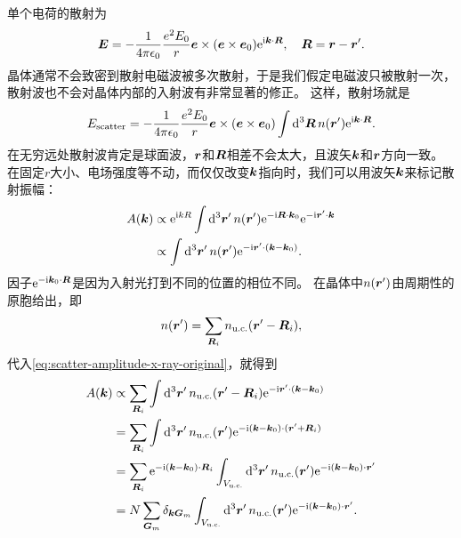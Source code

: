 \documentclass[hyperref, UTF8, a4paper]{ctexart}
\newcommand*{\ii}{\mathrm{i}}
\newcommand*{\ee}{\mathrm{e}}
\begin{document}
单个电荷的散射为
\begin{equation}
    \vb*{E} = -\frac{1}{4\pi \epsilon_0} \frac{e^2 E_0}{r} \vb*{e} \times (\vb*{e} \times \vb*{e}_0) \ee^{\ii \vb*{k} \cdot \vb*{R}}, \quad \vb*{R} = \vb*{r} - \vb*{r}'.
\end{equation}
晶体通常不会致密到散射电磁波被多次散射，于是我们假定电磁波只被散射一次，散射波也不会对晶体内部的入射波有非常显著的修正。
这样，散射场就是
\begin{equation}
    E_\text{scatter} = -\frac{1}{4\pi \epsilon_0} \frac{e^2 E_0}{r} \vb*{e} \times (\vb*{e} \times \vb*{e}_0) \int \dd[3]{\vb*{R}} n(\vb*{r}') \ee^{\ii \vb*{k} \cdot \vb*{R}}.
\end{equation}
在无穷远处散射波肯定是球面波，$\vb*{r}$和$\vb*{R}$相差不会太大，且波矢$\vb*{k}$和$\vb*{r}$方向一致。
在固定$r$大小、电场强度等不动，而仅仅改变$\vb*{k}$指向时，我们可以用波矢$\vb*{k}$来标记散射振幅：
\begin{equation}
    \begin{aligned}
        A(\vb*{k}) &\propto \ee^{\ii k R} \int \dd[3]{\vb*{r}'} n(\vb*{r}') \ee^{- \ii \vb*{R} \cdot \vb*{k}_0} \ee^{- \ii \vb*{r}' \cdot \vb*{k}} \\
        &\propto \int \dd[3]{\vb*{r}'} n(\vb*{r}') \ee^{- \ii \vb*{r}' \cdot (\vb*{k} - \vb*{k}_0)}.
    \end{aligned}
    \label{eq:scatter-amplitude-x-ray-original}
\end{equation}
因子$\ee^{- \ii \vb*{k}_0 \cdot \vb*{R}}$是因为入射光打到不同的位置的相位不同。
在晶体中$n(\vb*{r}')$由周期性的原胞给出，即
\begin{equation}
    n(\vb*{r}') = \sum_{\vb*{R}_i} n_\text{u.c.}(\vb*{r}' - \vb*{R}_i),
\end{equation}
代入\eqref{eq:scatter-amplitude-x-ray-original}，就得到
\[
    \begin{aligned}
        A(\vb*{k}) &\propto \sum_{\vb*{R}_i} \int \dd[3]{\vb*{r}'} n_\text{u.c.}(\vb*{r}' - \vb*{R}_i) \ee^{-\ii \vb*{r}' \cdot (\vb*{k} - \vb*{k}_0)} \\
        &= \sum_{\vb*{R}_i} \int \dd[3]{\vb*{r}'} n_\text{u.c.}(\vb*{r}') \ee^{-\ii (\vb*{k} - \vb*{k}_0) \cdot (\vb*{r}' + \vb*{R}_i)} \\
        &= \sum_{\vb*{R}_i} \ee^{-\ii (\vb*{k} - \vb*{k}_0) \cdot \vb*{R}_i} \int_{V_{\text{u.c.}}} \dd[3]{\vb*{r}'} n_\text{u.c.}(\vb*{r}') \ee^{-\ii (\vb*{k} - \vb*{k}_0) \cdot \vb*{r}'} \\
        &= N \sum_{\vb*{G}_m} \delta_{\vb*{k} \vb*{G}_m} \int_{V_{\text{u.c.}}} \dd[3]{\vb*{r}'} n_\text{u.c.}(\vb*{r}') \ee^{-\ii (\vb*{k} - \vb*{k}_0) \cdot \vb*{r}'}.
    \end{aligned}
\]
\end{document}
